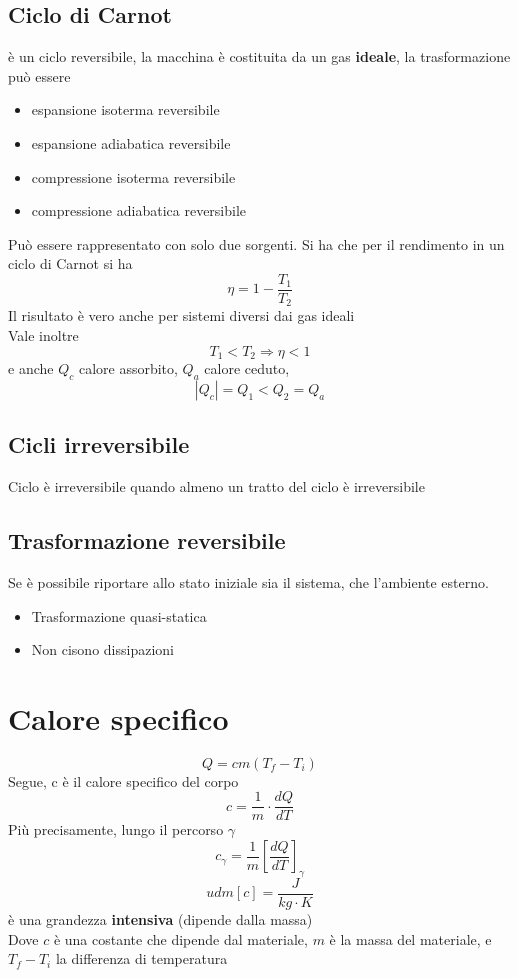 \documentclass[a4paper]{report}
\begin{document}
  \subsection{Ciclo di Carnot}
  è un ciclo reversibile, la macchina è costituita da un gas \textbf{ideale}, la trasformazione può essere
  \begin{itemize}
    \item espansione isoterma reversibile
    \item espansione adiabatica reversibile
    \item compressione isoterma reversibile
    \item compressione adiabatica reversibile
  \end{itemize}
  Può essere rappresentato con solo due sorgenti. Si ha che per il rendimento in un ciclo di Carnot si ha
  \[ \eta = 1 - \frac{T_1}{T_2}\]
  Il risultato è vero anche per sistemi diversi dai gas ideali \\
  Vale inoltre
  \[ T_1 < T_2 \Rightarrow \eta < 1 \]
  e anche $Q_c$ calore assorbito, $Q_a$ calore ceduto,
  \[ |Q_c| = Q_1 < Q_2 = Q_a \]

  \subsection{Cicli irreversibile}
  Ciclo è irreversibile quando almeno un tratto del ciclo è irreversibile

  \subsection{Trasformazione reversibile}
  Se è possibile riportare allo stato iniziale sia il sistema, che l'ambiente esterno.
  \begin{itemize}
    \item Trasformazione quasi-statica
    \item Non cisono dissipazioni
  \end{itemize}

  \section{Calore specifico}
  \[ Q = cm(T_f - T_i) \]
  Segue, c è il calore specifico del corpo
  \[ c = \frac{1}{m} \cdot \frac{dQ}{dT} \]
  Più precisamente, lungo il percorso $\gamma$
  \[ c_\gamma = \frac{1}{m} [\frac{dQ}{dT}]_\gamma \]
  \[ udm[c] = \frac{J}{kg\cdot K} \]
  è una grandezza \textbf{intensiva} (dipende dalla massa)\\
  Dove $c$ è una costante che dipende dal materiale, $m$ è la massa del materiale, e $T_f - T_i$ la differenza di temperatura
\end{document}
